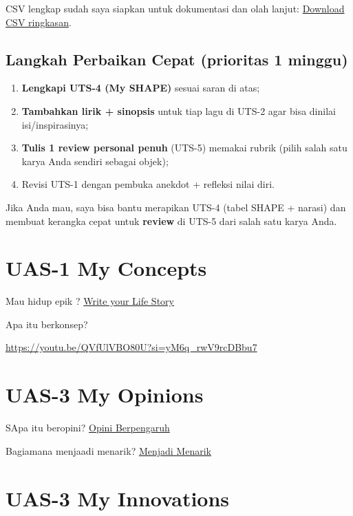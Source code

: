 \documentclass[
  letterpaper,
  DIV=11,
  numbers=noendperiod]{scrreprt}
\providecommand{\tightlist}{%
  \setlength{\itemsep}{0pt}\setlength{\parskip}{0pt}}\usepackage{longtable,booktabs,array}
\begin{document}
CSV lengkap sudah saya siapkan untuk dokumentasi dan olah lanjut:
\href{sandbox:/mnt/data/UTS_self_assessment.csv}{Download CSV
ringkasan}.

\section{Langkah Perbaikan Cepat (prioritas 1
minggu)}\label{langkah-perbaikan-cepat-prioritas-1-minggu}

\begin{enumerate}
\def\labelenumi{\arabic{enumi}.}
\tightlist
\item
  \textbf{Lengkapi UTS-4 (My SHAPE)} sesuai saran di atas;
\item
  \textbf{Tambahkan lirik + sinopsis} untuk tiap lagu di UTS-2 agar bisa
  dinilai isi/inspirasinya;
\item
  \textbf{Tulis 1 review personal penuh} (UTS-5) memakai rubrik (pilih
  salah satu karya Anda sendiri sebagai objek);
\item
  Revisi UTS-1 dengan pembuka anekdot + refleksi nilai diri.
\end{enumerate}

Jika Anda mau, saya bisa bantu merapikan UTS-4 (tabel SHAPE + narasi)
dan membuat kerangka cepat untuk \textbf{review} di UTS-5 dari salah
satu karya Anda.


\chapter{UAS-1 My Concepts}\label{uas-1-my-concepts}

Mau hidup epik ? \href{lifestory.pdf}{Write your Life Story}

Apa itu berkonsep?

\url{https://youtu.be/QVfUlVBO80U?si=yM6q_rwV9rcDBbu7}


\chapter{UAS-3 My Opinions}\label{uas-3-my-opinions}

SApa itu beropini? \href{BM\%20Opini.mp4}{Opini Berpengaruh}

Bagiamana menjaadi menarik? \href{./Interesting.mp4}{Menjadi Menarik}


\chapter{UAS-3 My Innovations}\label{uas-3-my-innovations}
\end{document}
